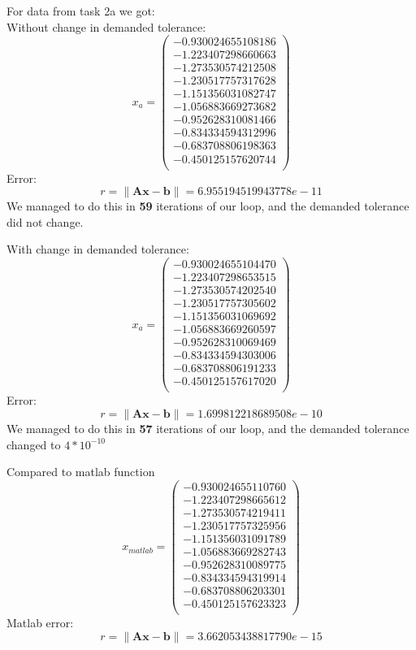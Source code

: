 \newpage
For data from task 2a we got: \\
Without change in demanded tolerance:
\[ x_a = \left( \begin{array}{cc}
-0.930024655108186 \\
-1.223407298660663 \\
-1.273530574212508 \\
-1.230517757317628 \\
-1.151356031082747 \\
-1.056883669273682 \\
-0.952628310081466 \\
-0.834334594312996 \\
-0.683708806198363 \\
-0.450125157620744 \\
\end{array} \right)
\]
Error:
\[ r = \| \mathbf{A}\mathbf{x} - \mathbf{b}\| = 6.955194519943778e-11 \]
We managed to do this in \textbf{59} iterations of our loop, and the demanded tolerance did not change.

With change in demanded tolerance:
\[ x_a = \left( \begin{array}{cc}
-0.930024655104470 \\
-1.223407298653515 \\
-1.273530574202540 \\
-1.230517757305602 \\
-1.151356031069692 \\
-1.056883669260597 \\
-0.952628310069469 \\
-0.834334594303006 \\
-0.683708806191233 \\
-0.450125157617020 \\
\end{array} \right)
\]
Error:
\[ r = \| \mathbf{A}\mathbf{x} - \mathbf{b}\| = 1.699812218689508e-10 \]
We managed to do this in \textbf{57} iterations of our loop, and the demanded tolerance changed to $4*10^{-10}$

Compared to matlab function
\[ x_{matlab} = \left( \begin{array}{cc}
  -0.930024655110760 \\
  -1.223407298665612 \\
  -1.273530574219411 \\
  -1.230517757325956 \\
  -1.151356031091789 \\
  -1.056883669282743 \\
  -0.952628310089775 \\
  -0.834334594319914 \\
  -0.683708806203301 \\
  -0.450125157623323 \\
\end{array} \right)
\]
Matlab error:
\[ r = \| \mathbf{A}\mathbf{x} - \mathbf{b}\| = 3.662053438817790e-15 \]

